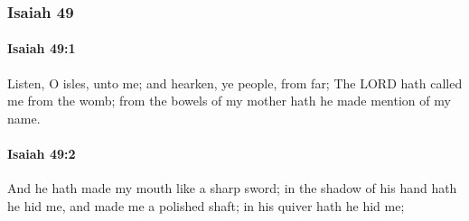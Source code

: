 	\subsubsection{Isaiah 49} %
		\label{ISAIAH-49}

		\paragraph{Isaiah 49:1} %
			\label{ISAIAH-49-1}

			Listen, O isles, unto me; and hearken, ye people, from far; The LORD hath called me from the womb; from the bowels of my mother hath he made mention of my name.


		\paragraph{Isaiah 49:2} %
			\label{ISAIAH-49-2}

			And he hath made my mouth like a sharp sword; in the shadow of his hand hath he hid me, and made me a polished shaft; in his quiver hath he hid me;

